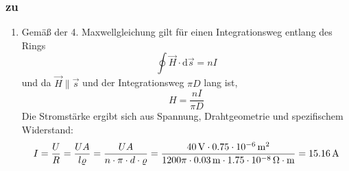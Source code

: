 \documentclass[a4paper]{scrartcl}
\begin{document}
\subsubsection{zu }
\label{lsg:RingspuleOhne}
\begin{enumerate}[noitemsep]
  \item 
Gemäß der 4. Maxwellgleichung gilt für einen Integrationsweg entlang des Rings
\begin{equation*}
  \oint \vec H \cdot \text{d}\vec s = nI
\end{equation*}
und da $\vec H \parallel \vec s$ und der Integrationsweg $\pi D$ lang ist, 
\begin{equation*}
  H = \frac{nI}{\pi D}
\end{equation*}
Die Stromstärke ergibt sich aus Spannung, Drahtgeometrie und spezifischem Widerstand:
\begin{equation*}
  I = \frac{U}{R} = \frac{UA}{l\varrho} = \frac{UA}{n \cdot \pi \cdot d \cdot \varrho} = \frac{\unit[40]{V}\cdot \unit[0.75\cdot 10^{-6}]{m^2}}{1200\pi \cdot \unit[0.03]{m}\cdot \unit[1.75 \cdot 10^{-8}]{\Omega \cdot m}} = \unit[15.16]{A}
\end{equation*}


\end{enumerate}
\end{document}
